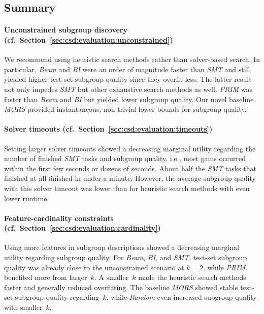 \documentclass{article}
\theoremstyle{definition}
\begin{document}
\subsection{Summary}
\label{sec:csd:evaluation:summary}

\paragraph{Unconstrained subgroup discovery (cf.~Section~\ref{sec:csd:evaluation:unconstrained})}

We recommend using heuristic search methods rather than solver-based search.
In particular, \emph{Beam} and \emph{BI} were an order of magnitude faster than \emph{SMT} and still yielded higher test-set subgroup quality since they overfit less.
The latter result not only impedes \emph{SMT} but other exhaustive search methods as well.
\emph{PRIM} was faster than \emph{Beam} and \emph{BI} but yielded lower subgroup quality.
Our novel baseline \emph{MORS} provided instantaneous, non-trivial lower bounds for subgroup quality.

\paragraph{Solver timeouts (cf.~Section~\ref{sec:csd:evaluation:timeouts})}

Setting larger solver timeouts showed a decreasing marginal utility regarding the number of finished \emph{SMT} tasks and subgroup quality, i.e., most gains occurred within the first few seconds or dozens of seconds.
About half the \emph{SMT} tasks that finished at all finished in under a minute.
However, the average subgroup quality with this solver timeout was lower than for heuristic search methods with even lower runtime.

\paragraph{Feature-cardinality constraints (cf.~Section~\ref{sec:csd:evaluation:cardinality})}

Using more features in subgroup descriptions showed a decreasing marginal utility regarding subgroup quality.
For \emph{Beam}, \emph{BI}, and \emph{SMT}, test-set subgroup quality was already close to the unconstrained scenario at $k=2$, while \emph{PRIM} benefited more from larger~$k$.
A smaller~$k$ made the heuristic search methods faster and generally reduced overfitting.
The baseline \emph{MORS} showed stable test-set subgroup quality regarding~$k$, while \emph{Random} even increased subgroup quality with smaller~$k$.
\end{document}
